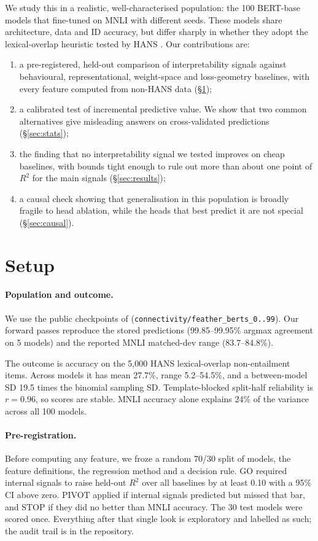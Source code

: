 \documentclass[10pt]{article}
\begin{document}
We study this in a realistic, well-characterised population: the 100 BERT-base models that \citet{mccoy2020} fine-tuned on MNLI with different seeds. These models share architecture, data and ID accuracy, but differ sharply in whether they adopt the lexical-overlap heuristic tested by HANS \citep{mccoy2019}. Our contributions are:
\begin{enumerate}\itemsep0pt
\item a pre-registered, held-out comparison of interpretability signals against behavioural, representational, weight-space and loss-geometry baselines, with every feature computed from non-HANS data (\S\ref{sec:setup});
\item a calibrated test of incremental predictive value. We show that two common alternatives give misleading answers on cross-validated predictions (\S\ref{sec:stats});
\item the finding that no interpretability signal we tested improves on cheap baselines, with bounds tight enough to rule out more than about one point of $R^2$ for the main signals (\S\ref{sec:results});
\item a causal check showing that generalisation in this population is broadly fragile to head ablation, while the heads that best predict it are not special (\S\ref{sec:causal}).
\end{enumerate}

\section{Setup}\label{sec:setup}
\paragraph{Population and outcome.} We use the public checkpoints of \citet{mccoy2020} (\texttt{connectivity/feather\_berts\_0..99}). Our forward passes reproduce the stored predictions (99.85--99.95\% argmax agreement on 5 models) and the reported MNLI matched-dev range (83.7--84.8\%).

The outcome is accuracy on the 5{,}000 HANS lexical-overlap non-entailment items. Across models it has mean 27.7\%, range 5.2--54.5\%, and a between-model SD 19.5 times the binomial sampling SD. Template-blocked split-half reliability is $r=0.96$, so scores are stable. MNLI accuracy alone explains 24\% of the variance across all 100 models.

\paragraph{Pre-registration.} Before computing any feature, we froze a random 70/30 split of models, the feature definitions, the regression method and a decision rule. GO required internal signals to raise held-out $R^2$ over all baselines by at least 0.10 with a 95\% CI above zero. PIVOT applied if internal signals predicted but missed that bar, and STOP if they did no better than MNLI accuracy. The 30 test models were scored once. Everything after that single look is exploratory and labelled as such; the audit trail is in the repository.
\end{document}
